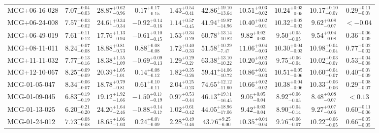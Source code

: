 \documentclass[onecolumn]{mn2e}
\begin{document}
\begin{landscape}
{\begin{center}
\begin{longtable}{lccccccccc}
MCG+06-16-028 & $7.07_{-0.03}^{+0.04}$ & $28.87_{-0.96}^{+0.62}$ & $0.17_{-0.15}^{+0.17}$ & $1.43_{-0.41}^{+0.54}$ &$42.86_{-13.64}^{+19.10}$ & $10.51_{-0.02}^{+0.03}$ & $10.24_{-0.05}^{+0.03}$ & $10.17_{-0.07}^{+0.10}$ & $0.29_{-0.07}^{+0.11}$ \\
MCG+06-24-008 & $7.57_{-0.02}^{+0.03}$ & $24.61_{-0.34}^{+0.34}$ & $-0.92_{-0.16}^{+0.14}$ & $1.14_{-0.45}^{+0.57}$ &$41.94_{-14.96}^{+19.87}$ & $10.40_{-0.01}^{+0.02}$ & $10.32_{-0.02}^{+0.02}$ & $9.62_{-0.07}^{+0.08}$ & $<-0.04$ \\
MCG+06-49-019 & $7.61_{-0.12}^{+0.11}$ & $17.76_{-0.94}^{+1.13}$ & $-0.61_{-0.15}^{+0.10}$ & $1.53_{-0.29}^{+0.34}$ &$60.78_{-10.82}^{+13.14}$ & $9.82_{-0.03}^{+0.02}$ & $9.50_{-0.05}^{+0.05}$ & $9.54_{-0.08}^{+0.04}$ & $0.36_{-0.09}^{+0.06}$ \\
MCG+08-11-011 & $8.24_{-0.08}^{+0.07}$ & $18.88_{-0.73}^{+0.81}$ & $0.88_{-0.08}^{+0.08}$ & $1.72_{-0.33}^{+0.40}$ &$51.58_{-7.47}^{+10.29}$ & $11.06_{-0.03}^{+0.04}$ & $10.30_{-0.03}^{+0.04}$ & $10.98_{-0.04}^{+0.04}$ & $0.77_{-0.02}^{+0.02}$ \\
MCG+11-11-032 & $7.77_{-0.16}^{+0.13}$ & $18.38_{-1.09}^{+1.55}$ & $-0.69_{-0.13}^{+0.09}$ & $1.29_{-0.27}^{+0.29}$ &$63.38_{-10.22}^{+13.10}$ & $10.20_{-0.03}^{+0.02}$ & $9.75_{-0.04}^{+0.06}$ & $10.02_{-0.07}^{+0.03}$ & $0.53_{-0.08}^{+0.04}$ \\
MCG+12-10-067 & $8.25_{-0.09}^{+0.09}$ & $20.39_{-1.01}^{+1.05}$ & $0.14_{-0.12}^{+0.08}$ & $1.82_{-0.26}^{+0.35}$ &$59.41_{-10.72}^{+14.06}$ & $10.86_{-0.03}^{+0.01}$ & $10.51_{-0.06}^{+0.05}$ & $10.60_{-0.07}^{+0.04}$ & $0.40_{-0.09}^{+0.07}$ \\
MCG-01-05-047 & $8.34_{-0.07}^{+0.06}$ & $18.78_{-0.81}^{+0.79}$ & $0.61_{-0.11}^{+0.10}$ & $2.04_{-0.23}^{+0.25}$ &$74.65_{-11.60}^{+12.12}$ & $10.66_{-0.02}^{+0.02}$ & $10.38_{-0.06}^{+0.04}$ & $10.33_{-0.06}^{+0.06}$ & $0.29_{-0.07}^{+0.08}$ \\
MCG-01-09-045 & $6.83_{-0.19}^{+0.19}$ & $19.12_{-1.66}^{+1.92}$ & $-1.50_{-0.19}^{+0.17}$ & $0.97_{-0.44}^{+0.53}$ &$46.13_{-16.45}^{+19.71}$ & $9.05_{-0.04}^{+0.05}$ & $8.92_{-0.05}^{+0.06}$ & $8.48_{-0.07}^{+0.08}$ & $<0.13$ \\
MCG-01-13-025 & $6.20_{-0.20}^{+0.21}$ & $24.20_{-2.46}^{+1.64}$ & $-0.88_{-0.17}^{+0.14}$ & $1.02_{-0.42}^{+0.61}$ &$44.05_{-17.06}^{+18.96}$ & $9.42_{-0.04}^{+0.03}$ & $8.90_{-0.14}^{+0.04}$ & $9.27_{-0.06}^{+0.07}$ & $0.60_{-0.06}^{+0.11}$ \\
MCG-01-24-012 & $7.73_{-0.08}^{+0.08}$ & $18.65_{-1.03}^{+1.06}$ & $0.24_{-0.09}^{+0.07}$ & $2.28_{-0.46}^{+0.49}$ &$43.76_{-6.00}^{+9.25}$ & $10.35_{-0.04}^{+0.04}$ & $9.76_{-0.07}^{+0.06}$ & $10.22_{-0.05}^{+0.06}$ & $0.66_{-0.05}^{+0.05}$ \\

\end{longtable}
\end{center}}
\end{landscape}
\end{document}
